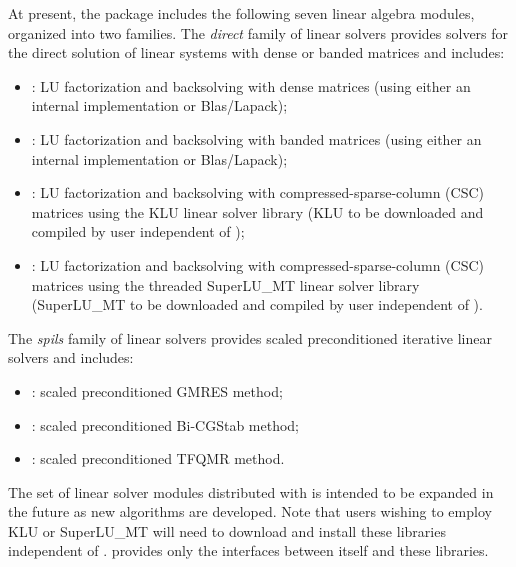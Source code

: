 At present, the package includes the following seven {\idas} linear algebra
modules, organized into two families. The {\em direct} family of linear
solvers provides solvers for the direct solution of linear systems with
dense or banded matrices and includes:
\begin{itemize} 
\item {\idadense}: LU factorization and backsolving with dense matrices
  (using either an internal implementation or Blas/Lapack); 
\item {\idaband}: LU factorization and backsolving with banded matrices
  (using either an internal implementation or Blas/Lapack); 
\item {\idaklu}: LU factorization and backsolving with
  compressed-sparse-column (CSC) matrices using the KLU linear solver
  library \cite{DaPa:10,KLU_site} (KLU to be downloaded and compiled by user independent 
  of {\ida});
\item {\idasuperlumt}: LU factorization and backsolving with
  compressed-sparse-column (CSC) matrices using the threaded
  SuperLU\_MT linear solver library \cite{Li:05,DGL:99,SuperLUMT_site} 
  (SuperLU\_MT to be downloaded and compiled by user independent 
  of {\ida}).
\end{itemize}
The {\em spils} family of linear solvers provides scaled preconditioned
iterative linear solvers and includes:
\begin{itemize} 
\item {\idaspgmr}: scaled preconditioned GMRES method;
\item {\idaspbcg}: scaled preconditioned Bi-CGStab method;
\item {\idasptfqmr}: scaled preconditioned TFQMR method.
\end{itemize}
The set of linear solver modules distributed with {\idas} is intended to be expanded in the
future as new algorithms are developed.
Note that users wishing to employ KLU or 
SuperLU\_MT will need to download and install these 
libraries independent of {\sundials}.
{\sundials} provides only the interfaces between itself and these libraries.

